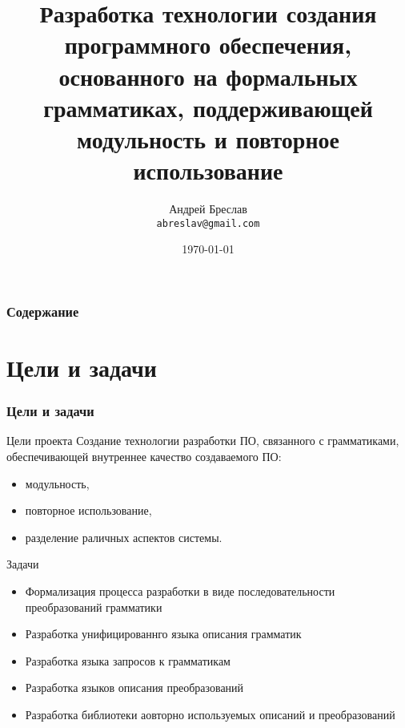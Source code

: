 \documentclass[paper=screen,10pt,unicode]{beamer}
\author{Андрей Бреслав \\ \texttt{abreslav@gmail.com}}
\institute[ИТМО]{СПбГУ ИТМО}
\title[Grammarware Engineering]{Разработка технологии создания программного обеспечения,
основанного на формальных грамматиках, поддерживающей
модульность и повторное использование}
\date{\today}
\begin{document}
\begin{frame}
	\titlepage
\end{frame}

\begin{frame}
	\frametitle{Содержание}
	\tableofcontents
\end{frame}

\section{Цели и задачи}
\begin{frame}
	\frametitle{Цели и задачи}

	\begin{block}{Цели проекта}
		Создание технологии разработки ПО, связанного с грамматиками, 
		обеспечивающей внутреннее качество создаваемого ПО:
		\begin{itemize}
			\item модульность,
			\item повторное использование,
			\item разделение раличных аспектов системы.
		\end{itemize}
	\end{block}
	
	\begin{block}{Задачи}
		\begin{itemize}
			\item Формализация процесса разработки в виде последовательности преобразований грамматики
			\item Разработка унифицированнго языка описания грамматик 
			\item Разработка языка запросов к грамматикам
			\item Разработка языков описания преобразований
			\item Разработка библиотеки аовторно используемых описаний и преобразований
		\end{itemize}
	\end{block}
\end{frame}
\end{document}
